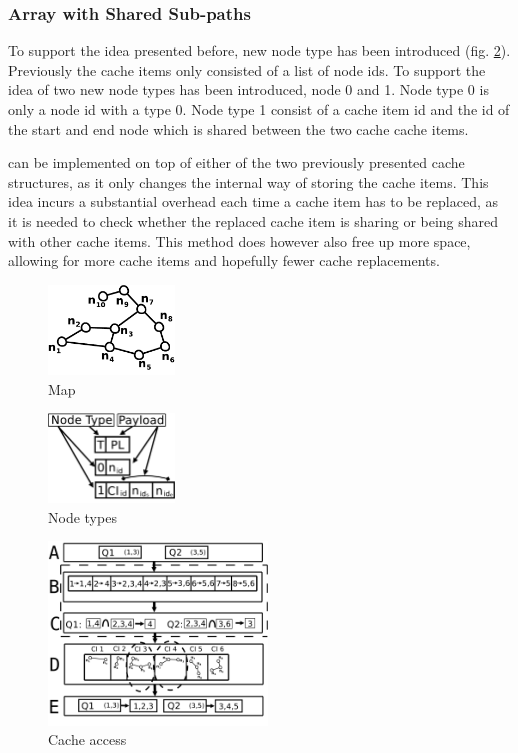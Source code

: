 \subsubsection{Array with Shared Sub-paths}
To support the \sps idea presented before, new node type has been introduced (fig. \ref{fig:nodetypes}). Previously the cache items only consisted of a list of node ids. To support the idea of \sps two new node types has been introduced, node 0 and 1. Node type 0 is only a node id with a type 0. Node type 1 consist of a cache item id and the id of the start and end node which is shared between the two cache cache items.

\sps can be implemented on top of either of the two previously presented cache structures, as it only changes the internal way of storing the cache items. This idea incurs a substantial overhead each time a cache item has to be replaced, as it is needed to check whether the replaced cache item is sharing or being shared with other cache items. This method does however also free up more space, allowing for more cache items and hopefully fewer cache replacements.


\begin{figure}
  \center
	\includegraphics[width=0.3\textwidth]{figures/map10n.pdf}
	\caption{Map}
  \label{fig:map10}
\end{figure}

\begin{figure}
  \center
	\includegraphics[width=0.3\textwidth]{figures/nodeType.pdf}
	\caption{Node types}
  \label{fig:nodetypes}
\end{figure}

\begin{figure}
  \center
	\includegraphics[width=0.52\textwidth]{figures/cacheTwoLayer.pdf}
	\caption{Cache access}
  \label{fig:cachestruc}
\end{figure}


